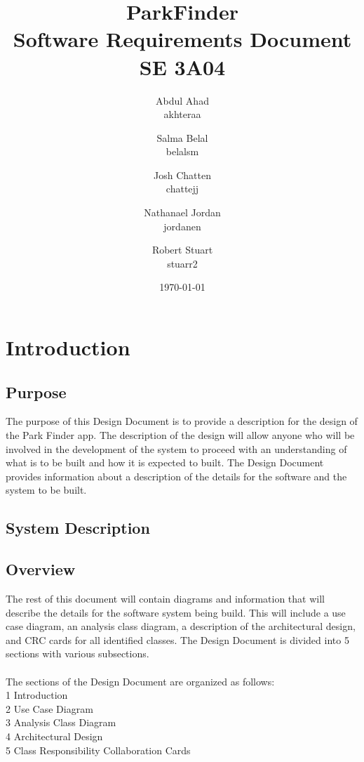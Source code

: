 \documentclass[titlepage]{article}
\title{ParkFinder\\Software Requirements Document\\SE 3A04}
\author{Abdul Ahad \\ akhteraa \and Salma Belal \\ belalsm \and Josh Chatten \\ chattejj \and
Nathanael Jordan \\ jordanen \and Robert Stuart \\ stuarr2}
\date{\today}
\begin{document}
\maketitle	
\thispagestyle{empty}
\clearpage
\setcounter{tocdepth}{2}%
\tableofcontents
\clearpage


\section{Introduction}
\label{sec:introduction}


\subsection{Purpose}
\label{sub:purpose}


 The purpose of this Design Document is to provide a description for the design of the Park Finder app. The description of the design will allow anyone who will be involved in the development of the system to proceed with an understanding of what is to be built and how it is expected to built. The Design Document provides information about a description of the details for the software and the system to be built.



\subsection{System Description}
\label{sub:system_description}



\subsection{Overview}
\label{sub:overview}


The rest of this document will contain diagrams and information that will describe the details for the software system being build. This will include a use case diagram, an analysis class diagram, a description of the architectural design, and CRC cards for all identified classes. The Design Document is divided into 5 sections with various subsections. \\
\\
 The sections of the Design Document are organized as follows:\\
 1 Introduction\\
 2 Use Case Diagram\\
 3 Analysis Class Diagram\\
 4 Architectural Design \\
 5 Class Responsibility Collaboration Cards
\end{document}
